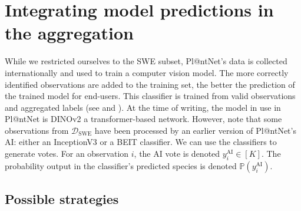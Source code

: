 \section{Integrating model predictions in the aggregation}

While we restricted ourselves to the SWE subset, Pl@ntNet's data is collected internationally and used to train a computer vision model.
The more correctly identified observations are added to the training set, the better the prediction of the trained model for end-users.
This classifier is trained from valid observations and aggregated labels (see  and ).
At the time of writing, the model in use in Pl@ntNet is DINOv2 \citep{oquab2024dinov2} a transformer-based network.
However, note that some observations from $\mathcal{D}_{\text{SWE}}$ have been processed by an earlier version of Pl@ntNet's AI: either an InceptionV3 \citep{szegedy2015rethinking} or a BEIT \citep{bao2021beit} classifier.
We can use the classifiers to generate votes.
For an observation $i$, the AI vote is denoted $y_i^{\text{AI}}\in[K]$. The probability output in the classifier's predicted species is denoted $\mathbb{P}(y_i^{\text{AI}})$.

\subsection{Possible strategies}
\label{sub:strats_ai}

